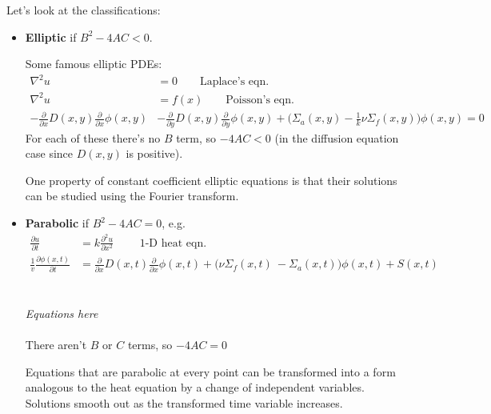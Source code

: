 \documentclass[12pt]{exam}
\newcommand{\Macro}{\ensuremath{\Sigma}}
\begin{document}
Let's look at the classifications:
\begin{itemize}
\item \textbf{Elliptic} if $B^2 - 4 AC < 0$. %

Some famous elliptic PDEs:
\begin{align*}
\nabla^2 u &= 0 \qquad \text{Laplace's eqn.} \nonumber \\
\nabla^2 u &= f(x) \qquad \text{Poisson's eqn.} \nonumber \\
-\frac{\partial}{\partial x}D(x,y)\frac{\partial}{\partial x}\phi(x,y) &- \frac{\partial}{\partial y}D(x,y)\frac{\partial}{\partial y}\phi(x,y) + \bigl(\Macro_a(x,y) - \frac{1}{k} \nu \Macro_f(x,y)\bigr) \phi(x,y) = 0\nonumber
\end{align*}
For each of these there's no $B$ term, so $-4AC < 0$ (in the diffusion equation case since $D(x,y)$ is positive).

One property of constant coefficient elliptic equations is that their solutions can be studied using the Fourier transform. %

\item \textbf{Parabolic} if $B^2 - 4 AC = 0$, e.g.
\ifprintanswers
\begin{align}
\frac{\partial u}{\partial t} &= k \frac{\partial^2 u}{\partial x^2} \qquad \text{ 1-D heat eqn.} \nonumber \\
\frac{1}{v}\frac{\partial \phi(x,t)}{\partial t} &= \frac{\partial}{\partial x}D(x,t)\frac{\partial}{\partial x}\phi(x,t) + \bigl(\nu \Macro_f(x,t)\ - \Macro_a(x,t)\bigr) \phi(x,t) + S(x,t)\nonumber
\end{align}
\else
 \\ \\ \hspace*{8em}\textit{Equations here}\\ \\
\fi
There aren't $B$ or $C$ terms, so $-4AC = 0$

Equations that are parabolic at every point can be transformed into a form analogous to the heat equation by a change of independent variables. Solutions smooth out as the transformed time variable increases.
\end{itemize}
\end{document}
